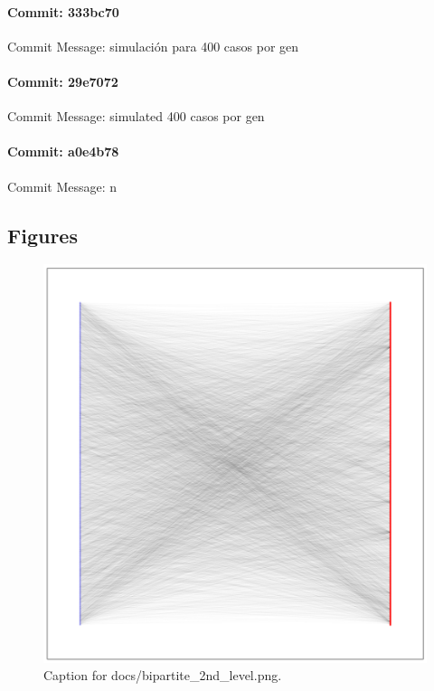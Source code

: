 \documentclass{article}
\begin{document}
\paragraph{Commit: 333bc70}
Commit Message: simulación para 400 casos por gen

\paragraph{Commit: 29e7072}
Commit Message: simulated 400 casos por gen

\paragraph{Commit: a0e4b78}
Commit Message: n

\subsection{Figures}
\begin{figure}[h] \centering \includegraphics{docs/bipartite_2nd_level.png} \caption{Caption for docs/bipartite_2nd_level.png.} \end{figure}
\end{document}
